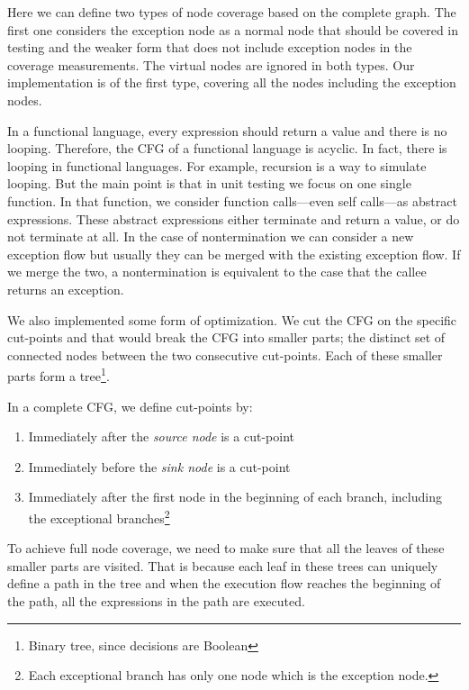 \documentclass[12pt,a4paper]{report}
\begin{document}
Here we can define two types of node coverage based on the complete graph. The first one considers the exception node as a normal node that should be covered in testing and the weaker form that does not include exception nodes in the coverage measurements. The virtual nodes are ignored in both types. Our implementation is of the first type, covering all the nodes including the exception nodes.

In a functional language, every expression should return a value and there is no looping. Therefore, the CFG of a functional language is acyclic. In fact, there is looping in functional languages. For example, recursion is a way to simulate looping. But the main point is that in unit testing we focus on one single function. In that function, we consider function calls---even self calls---as abstract expressions. These abstract expressions either terminate and return a value, or do not terminate at all. In the case of nontermination we can consider a new exception flow but usually they can be merged with the existing exception flow. If we merge the two, a nontermination is equivalent to the case that the callee returns an exception. 

We also implemented some form of optimization. We cut the CFG on the specific cut-points and that would break the CFG into smaller parts; the distinct set of connected nodes between the two consecutive cut-points. Each of these smaller parts form a tree\footnote{Binary tree, since decisions are Boolean}.

In a complete CFG, we define cut-points by:  

\begin{enumerate}
 \item Immediately after the \emph{source node} is a cut-point
 \item Immediately before the \emph{sink node} is a cut-point
 \item Immediately after the first node in the beginning of each branch, including the exceptional branches\footnote{Each exceptional branch has only one node which is the exception node.} 
\end{enumerate}

To achieve full node coverage, we need to make sure that all the leaves of these smaller parts are visited. That is because each leaf in these trees can uniquely define a path in the tree and when the execution flow reaches the beginning of the path, all the expressions in the path are executed.
 
\end{document}
